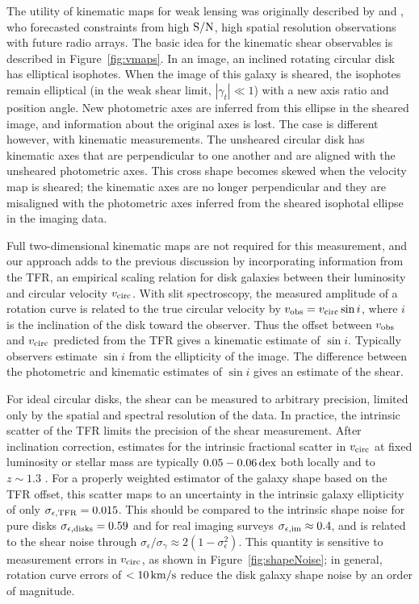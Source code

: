 \documentclass[12pt]{article}
\begin{document}
The utility of kinematic maps for weak lensing was originally described by \citet{Blain2002} and \citet{Morales2006}, who forecasted constraints from high ${\rm S/N}$, high spatial resolution observations with future radio arrays. The basic idea for the kinematic shear observables is described in Figure~\ref{fig:vmaps}. In an image, an inclined rotating circular disk has elliptical isophotes. When the image of this galaxy is sheared, the isophotes remain elliptical (in the weak shear limit, $|\gamma_t|\ll1$) with a new axis ratio and position angle. New photometric axes are inferred from this ellipse in the sheared image, and information about the original axes is lost. The case is different however, with kinematic measurements. The unsheared circular disk has kinematic axes that are perpendicular to one another and are aligned with the unsheared photometric axes. This cross shape becomes skewed when the velocity map is sheared; the kinematic axes are no longer perpendicular and they are misaligned with the photometric axes inferred from the sheared isophotal ellipse in the imaging data.

Full two-dimensional kinematic maps are not required for this measurement, and our approach adds to the previous discussion by incorporating information from the TFR, an empirical scaling relation for disk galaxies between their luminosity and circular velocity $v_{\rm circ}$. With slit spectroscopy, the measured amplitude of a rotation curve is related to the true circular velocity by $v_{\rm obs} = v_{\rm circ} \sin i$, where $i$ is the inclination of the disk toward the observer. Thus the offset between $v_{\rm obs}$ and $v_{\rm circ}$ predicted from the TFR gives a kinematic estimate of $\sin i$. Typically observers estimate $\sin i$ from the ellipticity of the image. The difference between the photometric and kinematic estimates of $\sin i$ gives an estimate of the shear.

For ideal circular disks, the shear can be measured to arbitrary precision, limited only by the spatial and spectral resolution of the data. In practice, the intrinsic scatter of the TFR limits the precision of the shear measurement. 
After inclination correction, estimates for the intrinsic fractional scatter in $v_{\rm circ}$ at fixed luminosity or stellar mass are typically $0.05-0.06\,{\rm dex}$ both locally and to $z\sim1.3$ \citep{Reyes2011, Miller2011}. For a properly weighted estimator of the galaxy shape based on the TFR offset, this scatter maps to an uncertainty in the intrinsic galaxy ellipticity of only $\sigma_{\epsilon, {\rm TFR}}=0.015$. This should be compared to the intrinsic shape noise for pure disks $\sigma_{\epsilon, {\rm disks}}=0.59$ and for real imaging surveys $\sigma_{\epsilon, {\rm im}}\approx0.4$, and is related to the shear noise through $\sigma_\epsilon / \sigma_\gamma \approx 2(1-\sigma_\epsilon^2)$\citep{Bernstein2002, Hirata2004}. This quantity is sensitive to measurement errors in $v_{\rm circ}$, as shown in Figure~\ref{fig:shapeNoise}; in general, rotation curve errors of $<10\,{\rm km/s}$ reduce the disk galaxy shape noise by an order of magnitude.
\end{document}
